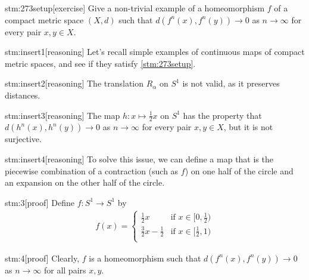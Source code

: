 
\begin{stm}{stm:273setup}[exercise]
Give a non-trivial example of a homeomorphism $f$ of a compact metric space $(X,d)$ such that $d(f^n(x), f^n(y)) \to 0$ as $n \to \infty$ for every pair $x,y \in X$.
\end{stm}


\begin{stm}{stm:insert1}[reasoning]
Let's recall simple examples of continuous maps of compact metric spaces, and see if they satisfy \ref{stm:273setup}.
\end{stm}

\begin{stm}{stm:insert2}[reasoning]
The translation $R_\alpha$ on $S^1$ is not valid, as it preserves distances.
\end{stm}

\begin{stm}{stm:insert3}[reasoning]
The map $h: x \mapsto \frac{1}{2}x$ on $S^1$ has the property that $d(h^n(x), h^n(y)) \to 0$ as $n \to \infty$ for every pair $x,y \in X$, but it is not surjective.
\end{stm}

\begin{stm}{stm:insert4}[reasoning]
To solve this issue, we can define a map that is the piecewise combination of a contraction (such as $f$) on one half of the circle and an expansion on the other half of the circle.
\end{stm}

\begin{stm}{stm:3}[proof]
Define $f: S^1 \to S^1$ by
\begin{align*}
f(x) = 
\begin{cases}
\frac{1}{2}x & \text{if } x \in [0, \frac{1}{2}) \\
\frac{3}{2}x - \frac{1}{2} & \text{if } x \in [\frac{1}{2}, 1) \\
\end{cases}
\end{align*}
\end{stm}

\begin{stm}{stm:4}[proof]
Clearly, $f$ is a homeomorphism such that $d(f^n(x), f^n(y)) \to 0$ as $n \to \infty$ for all pairs $x, y$.
\end{stm}
